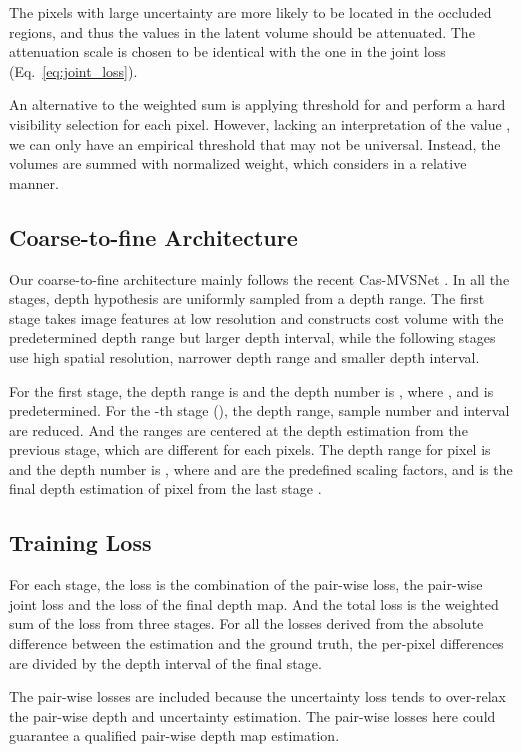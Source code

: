 \documentclass{bmvc2k}
\begin{document}
The pixels with large uncertainty are more likely to be located in the occluded regions, and thus the values in the latent volume should be attenuated. The attenuation scale is chosen to be identical with the one in the joint loss (Eq.\ \ref{eq:joint_loss}). 

An alternative to the weighted sum is applying threshold for  and perform a hard visibility selection for each pixel. However, lacking an interpretation of the value , we can only have an empirical threshold that may not be universal. Instead, the volumes are summed with normalized weight, which considers  in a relative manner. 

\subsection{Coarse-to-fine Architecture}\label{method_cas}
Our coarse-to-fine architecture mainly follows the recent Cas-MVSNet \cite{gu2020cascade}. In all the stages, depth hypothesis are uniformly sampled from a depth range. The first stage takes image features at low resolution and constructs cost volume with the predetermined depth range but larger depth interval, while the following stages use high spatial resolution, narrower depth range and smaller depth interval. 

For the first stage, the depth range is  and the depth number is , where ,  and  is predetermined. For the -th stage (), the depth range, sample number and interval are reduced. And the ranges are centered at the depth estimation from the previous stage, which are different for each pixels. The depth range for pixel  is  and the depth number is , where  and  are the predefined scaling factors, and  is the final depth estimation of pixel  from the last stage . 

\subsection{Training Loss}\label{method_loss}
For each stage, the loss is the combination of the pair-wise  loss, the pair-wise joint loss and the  loss of the final depth map. And the total loss is the weighted sum of the loss from three stages. For all the losses derived from the absolute difference between the estimation and the ground truth, the per-pixel differences are divided by the depth interval of the final stage. 

The pair-wise  losses are included because the uncertainty loss tends to over-relax the pair-wise depth and uncertainty estimation. The pair-wise  losses here could guarantee a qualified pair-wise depth map estimation.
\end{document}
